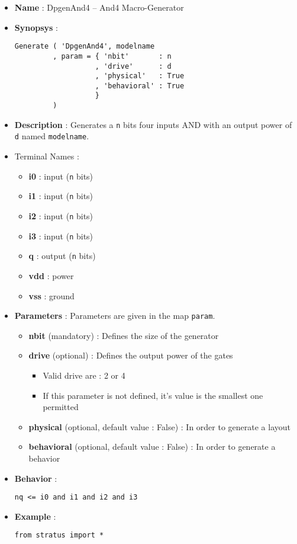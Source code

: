 \begin{itemize}
    \item \textbf{Name} : DpgenAnd4 -- And4 Macro-Generator
    \item \textbf{Synopsys} :
\begin{verbatim}
Generate ( 'DpgenAnd4', modelname
         , param = { 'nbit'       : n
                   , 'drive'      : d
                   , 'physical'   : True
                   , 'behavioral' : True                   
                   }
         )
\end{verbatim}
    \item \textbf{Description} : Generates a \verb-n- bits four inputs AND with an output power of \verb-d- named \verb-modelname-.
    \item Terminal Names :
    \begin{itemize}
        \item \textbf{i0} : input (\verb-n- bits)
        \item \textbf{i1} : input (\verb-n- bits)
        \item \textbf{i2} : input (\verb-n- bits)
        \item \textbf{i3} : input (\verb-n- bits)
        \item \textbf{q} : output (\verb-n- bits)
        \item \textbf{vdd} : power
        \item \textbf{vss} : ground
    \end{itemize}
    \item \textbf{Parameters} : Parameters are given in the map \verb-param-.
    \begin{itemize}
        \item \textbf{nbit} (mandatory) : Defines the size of the generator
        \item \textbf{drive} (optional) : Defines the output power of the gates
        \begin{itemize}
            \item Valid drive are : 2 or 4
            \item If this parameter is not defined, it's value is the smallest one permitted
        \end{itemize}
        \item \textbf{physical} (optional, default value : False) : In order to generate a layout
        \item \textbf{behavioral} (optional, default value : False) : In order to generate a behavior
    \end{itemize}
    \item \textbf{Behavior} :
\begin{verbatim}
nq <= i0 and i1 and i2 and i3
\end{verbatim}
    \item \textbf{Example} :
\begin{verbatim}
from stratus import *


\end{verbatim}
\end{itemize}
